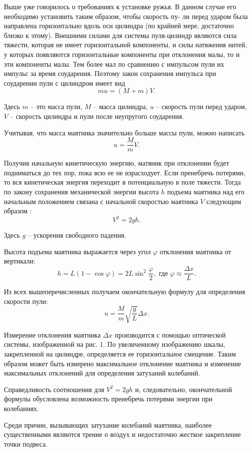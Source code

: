 \documentclass[a4paper,12pt]{article} %
\begin{document}
Выше уже говорилось о требованиях к установке ружья. В данном
случае его необходимо установить таким образом, чтобы скорость пу-
ли перед ударом была направлена горизонтально вдоль оси цилиндра
(по крайней мере, достаточно близко к этому). Внешними силами для системы пуля-цилиндр являются сила тяжести, которая не имеет горизонтальной компоненты, и силы натяжения нитей, у которых появляются горизонтальные компоненты при отклонения малы, то и эти компоненты малы. Тем более мал по сравнению с импульсом пули их импульс за время соударения. Поэтому закон сохранения импульса при соударении пули с цилиндром имеет вид \[ mu = (M + m) V.\]

Здесь $m$ -- это масса пули, $M$ -- масса цилиндра, $u$ -- скорость пули перед ударом, $V$ --  скорость цилиндра и пули после неупругого соударения.

Учитывая, что масса маятника значительно больше массы пули, можно написать \[ u = \frac{M}{m}V.\]

Получив начальную кинетическую энергию, матяник при отклонении будет подниматься до тех пор, пока всю ее не израсходует. Если пренебречь потерями, то вся кинетическая энергия переходит в потенциальную в поле тяжести. Тогда по закону сохранения механической энергии высота $h$ подъема маятника над его начальным положением связана с начальной скоростью маятника $V$ следующим образом : \[ V^2 = 2gh.\]

Здесь $g$ -- ускорения свободного падения.

Высота подъема маятника выражается через угол $\varphi$ отклонения маятника от вертикали: \[ h = L(1 - \cos{\varphi}) = 2L \sin^2{\frac{\varphi}{2}}, \textbf{ где } \varphi \approx \frac{\Delta x}{L}.\]

Из всех вышеперечисленных получаем окончательную формулу для определения скорости пули:\[ u = \frac{M}{m}\sqrt{\frac{g}{L}}\Delta x.\]

Измерение отклонения маятника $\Delta x$ производится с помощью оптической системы, изображенной на рис. 1. По увеличенному изображению шкалы, закрепленной на цилиндре, определяется ее горизонтальное смещение. Таким образом может быть измерено максимальное отклонение маятника и изменение максимальных отклонений для определения затуханий колебаний.

Справедливость соотношения для $V^2 = 2gh$ и, следовательно, окончательной формулы обусловлена возможность пренебречь потерями энергии при колебаниях.

Среди причин, вызывающих затухание колебаний маятника, наиболее существенными являются трение о воздух и недостаточно жесткое закрепление точки подвеса.
\end{document}

